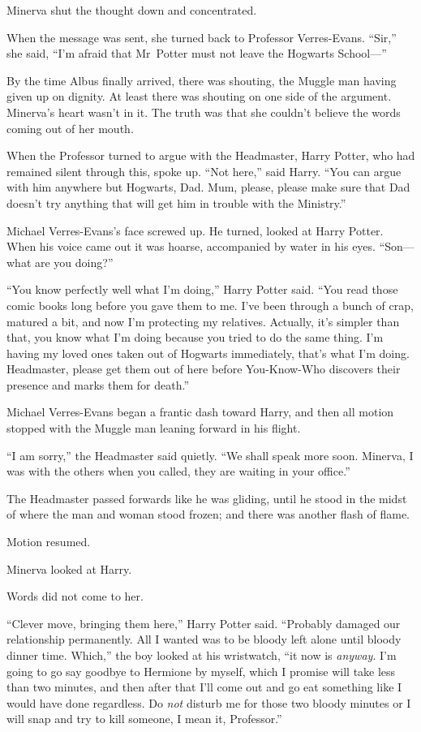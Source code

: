 Minerva shut the thought down and concentrated.

When the message was sent, she turned back to Professor Verres-Evans. “Sir,” she said, “I’m afraid that Mr~Potter must not leave the Hogwarts School—”

By the time Albus finally arrived, there was shouting, the Muggle man having given up on dignity. At least there was shouting on one side of the argument. Minerva’s heart wasn’t in it. The truth was that she couldn’t believe the words coming out of her mouth.

When the Professor turned to argue with the Headmaster, Harry Potter, who had remained silent through this, spoke up. “Not here,” said Harry. “You can argue with him anywhere but Hogwarts, Dad. Mum, please, please make sure that Dad doesn’t try anything that will get him in trouble with the Ministry.”

Michael Verres-Evans’s face screwed up. He turned, looked at Harry Potter. When his voice came out it was hoarse, accompanied by water in his eyes. “Son—what are you doing?”

“You know perfectly well what I’m doing,” Harry Potter said. “You read those comic books long before you gave them to me. I’ve been through a bunch of crap, matured a bit, and now I’m protecting my relatives. Actually, it’s simpler than that, you know what I’m doing because you tried to do the same thing. I’m having my loved ones taken out of Hogwarts immediately, that’s what I’m doing. Headmaster, please get them out of here before You-Know-Who discovers their presence and marks them for death.”

Michael Verres-Evans began a frantic dash toward Harry, and then all motion stopped with the Muggle man leaning forward in his flight.

“I am sorry,” the Headmaster said quietly. “We shall speak more soon. Minerva, I was with the others when you called, they are waiting in your office.”

The Headmaster passed forwards like he was gliding, until he stood in the midst of where the man and woman stood frozen; and there was another flash of flame.

Motion resumed.

Minerva looked at Harry.

Words did not come to her.

“Clever move, bringing them here,” Harry Potter said. “Probably damaged our relationship permanently. All I wanted was to be bloody left alone until bloody dinner time. Which,” the boy looked at his wristwatch, “it now is \emph{anyway}. I’m going to go say goodbye to Hermione by myself, which I promise will take less than two minutes, and then after that I’ll come out and go eat something like I would have done regardless. Do \emph{not} disturb me for those two bloody minutes or I will snap and try to kill someone, I mean it, Professor.”

